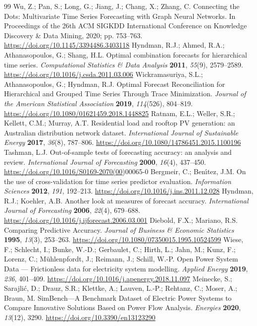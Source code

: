 \documentclass[electronics,article,submit,moreauthors]{Definitions/mdpi}
\begin{document}
\begin{thebibliography}{99}
 Wu, Z.; Pan, S.; Long, G.; Jiang, J.; Chang, X.; Zhang, C. Connecting the Dots: Multivariate Time Series Forecasting with Graph Neural Networks. In Proceedings of the 26th ACM SIGKDD International Conference on Knowledge Discovery \& Data Mining, 2020; pp. 753--763. \url{https://doi.org/10.1145/3394486.3403118}
 Hyndman, R.J.; Ahmed, R.A.; Athanasopoulos, G.; Shang, H.L. Optimal combination forecasts for hierarchical time series. \emph{Computational Statistics \& Data Analysis} \textbf{2011}, \emph{55}(9), 2579--2589. \url{https://doi.org/10.1016/j.csda.2011.03.006}
 Wickramasuriya, S.L.; Athanasopoulos, G.; Hyndman, R.J. Optimal Forecast Reconciliation for Hierarchical and Grouped Time Series Through Trace Minimization. \emph{Journal of the American Statistical Association} \textbf{2019}, \emph{114}(526), 804--819. \url{https://doi.org/10.1080/01621459.2018.1448825}
 Ratnam, E.L.; Weller, S.R.; Kellett, C.M.; Murray, A.T. Residential load and rooftop PV generation: an Australian distribution network dataset. \emph{International Journal of Sustainable Energy} \textbf{2017}, \emph{36}(8), 787--806. \url{https://doi.org/10.1080/14786451.2015.1100196}
 Tashman, L.J. Out-of-sample tests of forecasting accuracy: an analysis and review. \emph{International Journal of Forecasting} \textbf{2000}, \emph{16}(4), 437--450. \url{https://doi.org/10.1016/S0169-2070(00})00065-0
 Bergmeir, C.; Ben\'{\i}tez, J.M. On the use of cross-validation for time series predictor evaluation. \emph{Information Sciences} \textbf{2012}, \emph{191}, 192--213. \url{https://doi.org/10.1016/j.ins.2011.12.028}
 Hyndman, R.J.; Koehler, A.B. Another look at measures of forecast accuracy. \emph{International Journal of Forecasting} \textbf{2006}, \emph{22}(4), 679--688. \url{https://doi.org/10.1016/j.ijforecast.2006.03.001}
 Diebold, F.X.; Mariano, R.S. Comparing Predictive Accuracy. \emph{Journal of Business \& Economic Statistics} \textbf{1995}, \emph{13}(3), 253--263. \url{https://doi.org/10.1080/07350015.1995.10524599}
 Wiese, F.; Schlecht, I.; Bunke, W.-D.; Gerbaulet, C.; Hirth, L.; Jahn, M.; Kunz, F.; Lorenz, C.; M\"{u}hlenpfordt, J.; Reimann, J.; Schill, W.-P. Open Power System Data --- Frictionless data for electricity system modelling. \emph{Applied Energy} \textbf{2019}, \emph{236}, 401--409. \url{https://doi.org/10.1016/j.apenergy.2018.11.097}
 Meinecke, S.; Sarajli\'{c}, D.; Drauz, S.R.; Klettke, A.; Lauven, L.-P.; Rehtanz, C.; Moser, A.; Braun, M. SimBench---A Benchmark Dataset of Electric Power Systems to Compare Innovative Solutions Based on Power Flow Analysis. \emph{Energies} \textbf{2020}, \emph{13}(12), 3290. \url{https://doi.org/10.3390/en13123290}
\end{thebibliography}
\end{document}
